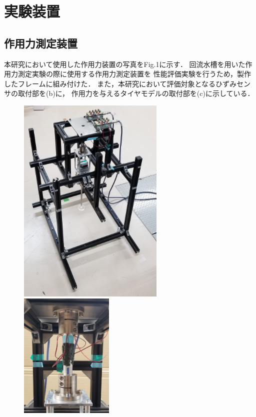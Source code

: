 \section{実験装置}

\subsection{作用力測定装置}
本研究において使用した作用力装置の写真をFig.1に示す．
回流水槽を用いた作用力測定実験の際に使用する作用力測定装置を
性能評価実験を行うため，製作したフレームに組み付けた．
また，本研究において評価対象となるひずみセンサの取付部を(b)に，
作用力を与えるタイヤモデルの取付部を(c)に示している．

\begin{figure}[htbp]
    \begin{minipage}[b]{0.48\linewidth}
        \centering
        \includegraphics[width=70mm]{images/21-1.png}
    \end{minipage}
    \begin{minipage}[b]{0.42\linewidth}
        \centering
        \includegraphics[width=45mm]{images/21-2.png}

\end{minipage}
\end{figure}
